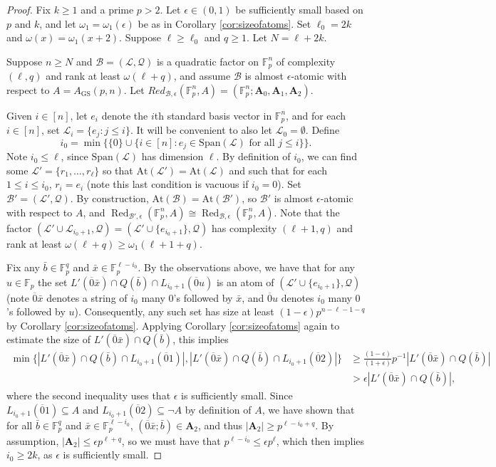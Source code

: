\documentclass[12pt,oneside,british,a4wide]{amsart}
\numberwithin{equation}{section}
\theoremstyle{definition}
\def\F{\mathbb{F}}
\def\GS{\mathrm{GS}}
\def\e{\epsilon}
\newcommand{\bbar}{\bar{b}}
\newcommand{\xbar}{\bar{x}}
\newcommand{\calL}{\mathcal{L}}
\newcommand{\calB}{\mathcal{B}}
\newcommand{\calQ}{\mathcal{Q}}
\newcommand{\Red}{{\mathrm{Red}}}
\newcommand{\Span}{{\mathrm{Span}}}
\newcommand{\At}{{\mathrm{At}}}
\def\Red{\operatorname{Red}}
\begin{document}
\begin{proof}
Fix $k\geq 1$ and a prime $p>2$.  Let $\e\in (0,1)$ be sufficiently small based on $p$ and $k$, and let $\omega_1=\omega_1(\e)$ be as in Corollary \ref{cor:sizeofatoms}.  Set $\ell_0=2k$ and $\omega(x)=\omega_1(x+2)$.  Suppose $\ell\geq \ell_0$ and $q\geq 1$.  Let $N=\ell+2k$.

Suppose $n\geq N$ and $\calB=(\calL,\calQ)$ is a quadratic factor  on $\F_p^n$  of complexity $(\ell,q)$ and rank at least $\omega(\ell+q)$, and assume $\calB$ is almost $\e$-atomic with respect to $A=A_{\GS}(p,n)$.  Let $Red_{\calB,\e}(\F_p^n,A)=(\F_p^n;\mathbf{A}_0,\mathbf{A}_1, \mathbf{A}_2)$.

Given $i\in [n]$, let $e_i$ denote the $i$th standard basis vector in $\F_p^n$, and for each $i\in [n]$, set $\calL_i=\{e_j: j\leq i\}$.  It will be convenient to also let $\calL_0=\emptyset$.  Define
$$
i_0=\min\Big\{\{0\}\cup \{i\in [n]: e_j\in \Span(\calL)\text{ for all }j\leq i\}\Big\}.
$$
Note $i_0\leq \ell$, since $\Span(\calL)$ has dimension $\ell$.  By definition of $i_0$, we can find some $\calL'=\{r_1,\ldots, r_{\ell}\}$ so that $\At(\calL')=\At(\calL)$ and such that for each $1\leq i\leq i_0$, $r_i=e_i$ (note this last condition is vacuous if $i_0=0$). Set $\calB'=(\calL',\calQ)$.  By construction, $\At(\calB)=\At(\calB')$, so $\calB'$ is almost $\e$-atomic with respect to $A$, and $\Red_{\calB',\e}(\F_p^n,A)\cong \Red_{\calB,\e}(\F_p^n,A)$.  Note that the factor $(\calL'\cup \calL_{i_0+1},\calQ)=(\calL'\cup \{e_{i_0+1}\},\calQ)$ has complexity $(\ell+1,q)$ and rank at least $\omega(\ell+q)\geq \omega_1(\ell+1+q)$.



Fix any $\bbar\in \F_p^q$ and $\xbar\in \F_p^{\ell-i_0}$.  By the observations above, we have that for any $u\in \F_p$ the set  $L'(\overline{0}\xbar)\cap Q(\bbar)\cap L_{i_0+1}(\overline{0}u)$ is an atom of $(\calL'\cup \{e_{i_0+1}\},\calQ)$ (note $\overline{0}\xbar$ denotes a string of $i_0$ many $0$'s followed by $\xbar$, and $\overline{0}u$ denotes $i_0$ many $0$'s followed by $u$).  Consequently, any such set has size at least $(1-\e)p^{n-\ell-1-q}$ by Corollary \ref{cor:sizeofatoms}.  Applying Corollary \ref{cor:sizeofatoms} again to estimate the size of $L'(\overline{0}\xbar)\cap Q(\bbar)$, this implies 
\begin{align*}
\min\{|L'(\overline{0}\xbar)\cap Q(\bbar)\cap L_{i_0+1}(\overline{0}1)|,|L'(\overline{0}\xbar)\cap Q(\bbar)\cap L_{i_0+1}(\overline{0}2)|\}&\geq \frac{(1-\e)}{(1+\e)}p^{-1}|L'(\overline{0}\xbar)\cap Q(\bbar)|\\
&>\e|L'(\overline{0}\xbar)\cap Q(\bbar)|,
\end{align*}
where the second inequality uses that $\e$ is sufficiently small.  Since $L_{i_0+1}(\overline{0}1)\subseteq A$ and $L_{i_0+1}(\overline{0}2)\subseteq \neg A$ by definition of $A$, we have shown that for all $\bbar\in \F_p^q$ and $\xbar\in \F_p^{\ell-i_0}$,  $(\overline{0}\xbar; \bbar) \in \mathbf{A}_2$, and thus $|\mathbf{A}_2|\geq p^{\ell-i_0+q}$.  By assumption, $|\mathbf{A}_2|\leq \e p^{\ell+q}$, so we must have that  $p^{\ell-i_0}\leq \e p^{\ell}$, which then implies $i_0\geq 2k$, as $\e$ is sufficiently small.  


\end{proof}
\end{document}
